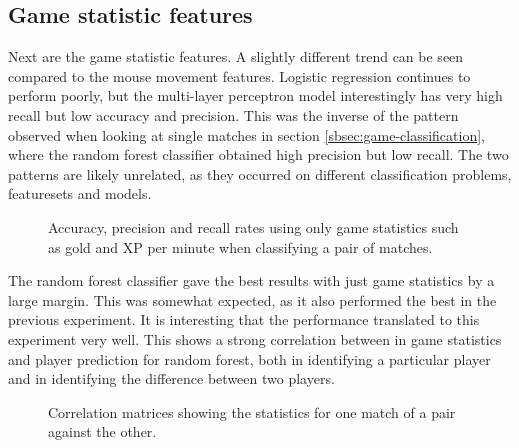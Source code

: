 \documentclass[Report.tex]{subfiles}
\newcommand{\baraxis}[8]{
\begin{axis}[
    ybar,
    title={#1},
    width=#5,
    height=#6,
    ymin=#3, ymax=#4,
    bar width=1em,
    legend style={at={#7},anchor=north,legend columns=-1},
    enlarge x limits=0.4,
    x tick label style={align=center,text width=#8},
    symbolic x coords={Logistic Regression, Random Forest, Multi-layer Perceptron},
    xtick=data,
    ylabel={#2}
]
}
\newcommand{\plotbar}[5]{
\addplot+[
	discard if not={numSplits}{#1},
	discard if not={split}{#2},
	discard if not={features}{#3},
] table [x=model, y=#4,col sep=comma] {data/19-pair-cv.csv};
\addlegendentry{#5}
}
\begin{document}

\subsection{Game statistic features}
Next are the game statistic features. A slightly different trend can be seen compared to the mouse movement features. Logistic regression continues to perform poorly, but the multi-layer perceptron model interestingly has very high recall but low accuracy and precision. This was the inverse of the pattern observed when looking at single matches in section \ref{sbsec:game-classification}, where the random forest classifier obtained high precision but low recall. The two patterns are likely unrelated, as they occurred on different classification problems, featuresets and models.


\begin{figure}[H]
\centering
{}
\caption{Accuracy, precision and recall rates using only game statistics such as gold and XP per minute when classifying a pair of matches.}
\end{figure}

The random forest classifier gave the best results with just game statistics by a large margin. This was somewhat expected, as it also performed the best in the previous experiment. It is interesting that the performance translated to this experiment very well. This shows a strong correlation between in game statistics and player prediction for random forest, both in identifying a particular player and in identifying the difference between two players. 

\begin{figure}[H]
\vspace{-2cm}
\begin{subfigure}{1\textwidth}
\end{subfigure}

\begin{subfigure}{1\textwidth}
\end{subfigure}
\caption{Correlation matrices showing the statistics for one match of a pair against the other.}
\label{fig:stats-correlation}
\end{figure}
\end{document}
